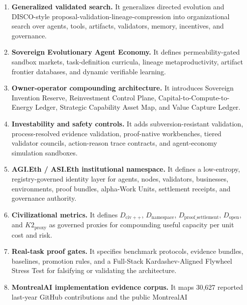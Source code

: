 \begin{enumerate}
  \textbf{Proof-gated AI-generating work engine.} It generalizes AI-GAs,
  OMNI-EPIC-style open-ended task generation, ADAS-style agent design,
  and Absolute Zero-style verifier-grounded self-play into a
  commercially independent layer that generates tasks, environments,
  agents, validators, proof templates, curricula, and capability
  packages under proof, replay, safety, settlement, AGI.Eth namespace
  authority, and civilizational value-to-energy constraints.
\item
  \textbf{Generalized validated search.} It generalizes directed
  evolution and DISCO-style proposal-validation-lineage-compression into
  organizational search over agents, tools, artifacts, validators,
  memory, incentives, and governance.
\item
  \textbf{Sovereign Evolutionary Agent Economy.} It defines
  permeability-gated sandbox markets, task-definition curricula, lineage
  metaproductivity, artifact frontier databases, and dynamic verifiable
  learning.
\item
  \textbf{Owner-operator compounding architecture.} It introduces
  Sovereign Invention Reserve, Reinvestment Control Plane,
  Capital-to-Compute-to-Energy Ledger, Strategic Capability Asset Map,
  and Value Capture Ledger.
\item
  \textbf{Investability and safety controls.} It adds
  subversion-resistant validation, process-resolved evidence validation,
  proof-native workbenches, tiered validator councils, action-reason
  trace contracts, and agent-economy simulation sandboxes.
\item
  \textbf{AGI.Eth / ASI.Eth institutional namespace.} It defines a
  low-entropy, registry-governed identity layer for agents, nodes,
  validators, businesses, environments, proof bundles, alpha-Work Units,
  settlement receipts, and governance authority.
\item
  \textbf{Civilizational metrics.} It defines \(D_{\mathrm{civ}++}\),
  \(D_{\mathrm{namespace}}\), \(D_{\mathrm{proof\_settlement}}\),
  \(D_{\mathrm{open}}\), and \(K2_{\mathrm{proxy}}\) as governed proxies
  for compounding useful capacity per unit cost and risk.
\item
  \textbf{Real-task proof gates.} It specifies benchmark protocols,
  evidence bundles, baselines, promotion rules, and a Full-Stack
  Kardashev-Aligned Flywheel Stress Test for falsifying or validating
  the architecture.
\item
  \textbf{MontrealAI implementation evidence corpus.} It maps 30,627
  reported last-year GitHub contributions and the public MontrealAI

\end{enumerate}

